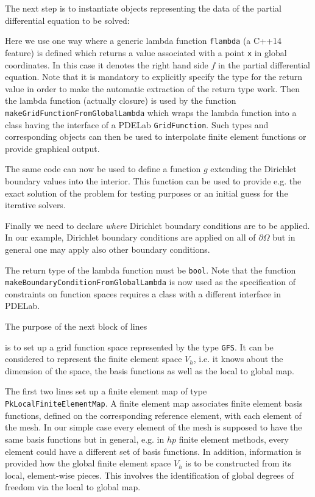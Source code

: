 \documentclass[a4paper,12pt]{article}
\begin{document}
The next step is to instantiate objects representing the
data of the partial differential equation to be solved:

Here we use one way where a generic lambda function \lstinline{flambda}
(a C++14 feature) is defined which returns a value associated
with a point \lstinline{x} in global coordinates. In this case it denotes the
right hand side $f$ in the partial differential equation. Note that it is 
mandatory to explicitly specify the type for the return value in order
to make the automatic extraction of the return type work. Then the lambda
function (actually closure) is used by the function \lstinline{makeGridFunctionFromGlobalLambda}
which wraps the lambda function into a class having the interface of a PDELab \lstinline{GridFunction}.
Such types and corresponding objects can then be used to interpolate
finite element functions or provide graphical output.

The same code can now be used to define a function $g$ extending the Dirichlet
boundary values into the interior. This function can be used 
to provide e.g. the exact solution of the problem for testing purposes
or an initial guess for the iterative solvers.


Finally we need to declare {\em where} Dirichlet boundary conditions 
are to be applied. In our example,
Dirichlet boundary conditions are applied on all of $\partial\Omega$ but
in general one may apply also other boundary conditions.

The return type of the lambda function must be \lstinline{bool}.
Note that the function \lstinline{makeBoundaryConditionFromGlobalLambda}
is now used as the specification of constraints on function spaces requires
a class with a different interface in PDELab.

The purpose of the next block of lines

is to set up a grid function space represented by the type \lstinline{GFS}.
It can be considered to represent the finite element space $V_h$, i.e.
it knows about the dimension of the space, the basis functions as well
as the local to global map. 

The first two lines set up a finite element map of type
\lstinline{PkLocalFiniteElementMap}. A finite element map associates
finite element basis functions, defined on the corresponding reference element, 
with each element of the mesh. In our
simple case every element of the mesh is supposed to have
the same basis functions but in general, e.g. in $hp$ finite element methods,
every element could have a different set of basis functions. In addition,
information is provided how the global finite element space $V_h$
is to be constructed from its local, element-wise pieces. This involves
the identification of global degrees of freedom via the local to global map.
\end{document}
